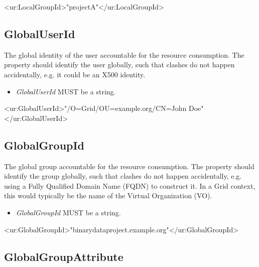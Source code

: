 \begin{XMLexample}
<ur:LocalGroupId>"projectA"</ur:LocalGroupId> 
\end{XMLexample}






\subsection{GlobalUserId}

The global identity of the user accountable for the resource consumption. The property should identify the user globally, such that clashes do not happen accidentally, e.g. it could be an X500 identity.
\begin{itemize}
\item \emph{GlobalUserId} MUST be a string.
\end{itemize}

\begin{XMLexample}
<ur:GlobalUserId>"/O=Grid/OU=example.org/CN=John Doe"</ur:GlobalUserId>
\end{XMLexample}






\subsection{GlobalGroupId}

The global group accountable for the resource consumption. The property should identify the group globally, such that clashes do not happen accidentally, e.g. using a Fully Qualified Domain Name (FQDN) to construct it. In a Grid context, this would typically be the name of the Virtual Organization (VO).
\begin{itemize}
\item \emph{GlobalGroupId} MUST be a string.
\end{itemize}

\begin{XMLexample}
<ur:GlobalGroupId>"binarydataproject.example.org"</ur:GlobalGroupId>
\end{XMLexample}






\subsection{GlobalGroupAttribute}

